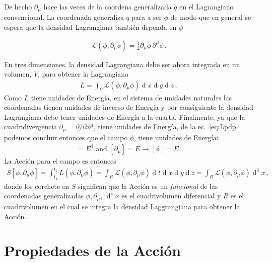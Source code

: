 \begin{frame}
De hecho $\partial_{\mu}$ hace las veces de la coordena generalizada $\dot{q}$ en el Lagrangiano convencional. La coordenada generaliza $q$ para a ser $\phi$ de modo que en general se espera que la densidad Lagrangiana también dependa en $\phi$


\begin{align}
  \label{eq:Lpdp}
  \mathcal{L}(\phi,\partial_{\mu} \phi)=  \frac{1}{2}{\partial_\mu\phi}\,{\partial^\mu\phi}\,.
\end{align}

En tres dimensiones, la densidad Lagrangiana debe ser ahora integrada en un volumen, $V$, para obtener la Lagrangiana
\begin{align}
  L=\int_V \mathcal{L}\left( \phi,\partial_{\mu}\phi \right) \operatorname{d}x\operatorname{d}y\operatorname{d}z\,,
\end{align}
Como $L$ tiene unidades de Energía, en el sistema de unidades naturales las coordenadas tienen unidades de inverso de Energía y por consiguiente la densidad Lagrangiana debe tener unidades de Energía a la cuarta. Finalmente, ya que la cuadridivergencia $\partial_{\mu}=\partial/\partial x^{\mu}$, tiene unidades de Energía, de la ec.~\eqref{eq:Lpdp} podemos concluir entonces que el campo $\phi$,  tiene unidades de Energía:
\begin{align}
 [\mathcal{L}]=E^4 \text{ and } [\partial_{\mu}]=E \to [\phi]=E\,.
\end{align}
La Acción para el campo es entonces
\begin{align}
  S[\phi,\partial_{\mu}\phi]=\int_{t_1}^{t_2} L\left( \phi,\partial_{\mu}\phi \right)=\int_{R} \mathcal{L}\left( \phi,\partial_{\mu}\phi \right) \operatorname{d}t\operatorname{d}x\operatorname{d}y\operatorname{d}z=\int_{R} \mathcal{L}\left( \phi,\partial_{\mu}\phi \right) \operatorname{d}^{4}x\,,
\end{align}
donde los corchete en $S$ significan que la Acción es un \emph{funcional} de las coordenadas generalizadas $\phi,\partial_{\mu}$, $\operatorname{d}^4 x$ es el cuadrivolumen diferencial y $R$ es el cuadrivolumen en el cual se integra la densidad Laggrangiana para obtener la Acción.



\end{frame}



\section{Propiedades de la Acción}


